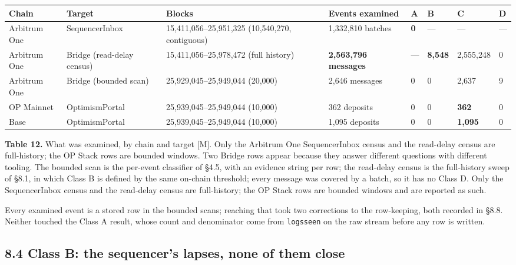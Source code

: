 \documentclass[conference]{IEEEtran}
\renewcommand{\_}{\textunderscore\allowbreak}
\begin{document}
\begin{table}[!t]
\centering
\footnotesize
\begin{tabular}{@{}llllllll@{}}
\toprule
Chain & Target & Blocks & Events examined & A & B & C & D \\
\midrule
Arbitrum One & SequencerInbox & 15,411,056--25,951,325 (10,540,270,
contiguous) & 1,332,810 batches & \textbf{0} & --- & --- & --- \\
Arbitrum One & Bridge (read-delay census) & 15,411,056--25,978,472 (full
history) & \textbf{2,563,796 messages} & --- & \textbf{8,548} &
2,555,248 & 0 \\
Arbitrum One & Bridge (bounded scan) & 25,929,045--25,949,044 (20,000) &
2,646 messages & 0 & 0 & 2,637 & 9 \\
OP Mainnet & OptimismPortal & 25,939,045--25,949,044 (10,000) & 362
deposits & 0 & 0 & \textbf{362} & 0 \\
Base & OptimismPortal & 25,939,045--25,949,044 (10,000) & 1,095 deposits
& 0 & 0 & \textbf{1,095} & 0 \\
\bottomrule
\end{tabular}
\par\vspace{5pt}
{\footnotesize\raggedright \textbf{Table 12.} What was examined, by chain and target {[}M{]}. Only
the Arbitrum One SequencerInbox census and the read-delay census are
full-history; the OP Stack rows are bounded windows. Two Bridge rows
appear because they answer different questions with different tooling.
The bounded scan is the per-event classifier of §4.5, with an evidence
string per row; the read-delay census is the full-history sweep of §8.1,
in which Class B is defined by the same on-chain threshold; every
message was covered by a batch, so it has no Class D. Only the
SequencerInbox census and the read-delay census are full-history; the OP
Stack rows are bounded windows and are reported as such.\par}
\end{table}

Every examined event is a stored row in the bounded scans; reaching that
took two corrections to the row-keeping, both recorded in §8.8. Neither
touched the Class A result, whose count and denominator come from
\texttt{logs\_seen} on the raw stream before any row is written.

\subsection{8.4 Class B: the sequencer's lapses, none of them
close}\label{class-b-the-sequencers-lapses-none-of-them-close}
\end{document}
